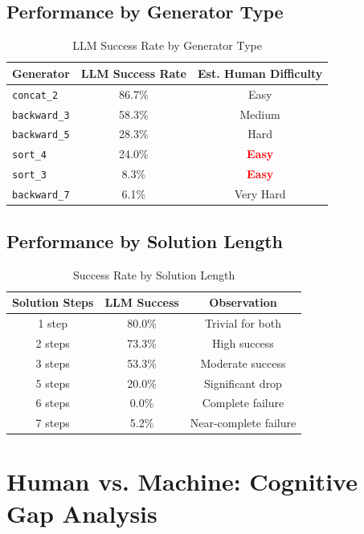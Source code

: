 \documentclass[11pt,a4paper]{article}
\begin{document}
\subsection{Performance by Generator Type}

\begin{table}[H]
\centering
\caption{LLM Success Rate by Generator Type}
\begin{tabular}{lcc}
\toprule
\textbf{Generator} & \textbf{LLM Success Rate} & \textbf{Est. Human Difficulty} \\
\midrule
\texttt{concat\_2} & 86.7\% & Easy \\
\texttt{backward\_3} & 58.3\% & Medium \\
\texttt{backward\_5} & 28.3\% & Hard \\
\texttt{sort\_4} & 24.0\% & \textcolor{red}{\textbf{Easy}} \\
\texttt{sort\_3} & 8.3\% & \textcolor{red}{\textbf{Easy}} \\
\texttt{backward\_7} & 6.1\% & Very Hard \\
\bottomrule
\end{tabular}
\end{table}

\subsection{Performance by Solution Length}

\begin{table}[H]
\centering
\caption{Success Rate by Solution Length}
\begin{tabular}{ccc}
\toprule
\textbf{Solution Steps} & \textbf{LLM Success} & \textbf{Observation} \\
\midrule
1 step & 80.0\% & Trivial for both \\
2 steps & 73.3\% & High success \\
3 steps & 53.3\% & Moderate success \\
5 steps & 20.0\% & Significant drop \\
6 steps & 0.0\% & Complete failure \\
7 steps & 5.2\% & Near-complete failure \\
\bottomrule
\end{tabular}
\end{table}

\section{Human vs. Machine: Cognitive Gap Analysis}
\end{document}

